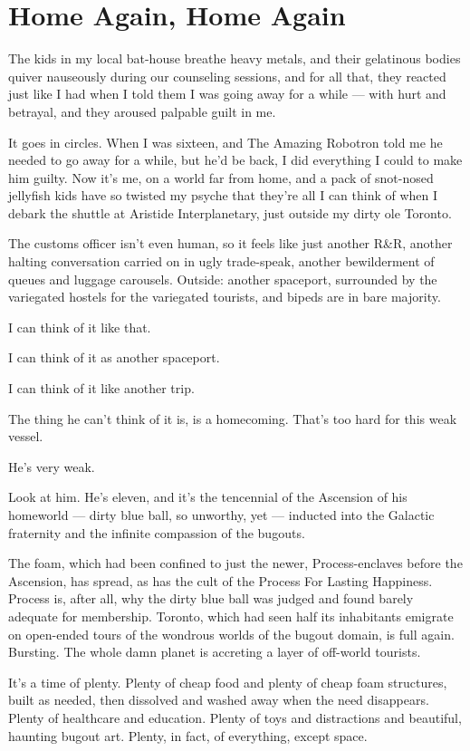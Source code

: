 \section{Home Again, Home Again}

The kids in my local bat-house breathe heavy metals, and their
gelatinous bodies quiver nauseously during our counseling sessions,
and for all that, they reacted just like I had when I told them I
was going away for a while --- with hurt and betrayal, and they
aroused palpable guilt in me.

It goes in circles. When I was sixteen, and The Amazing Robotron
told me he needed to go away for a while, but he'd be back, I did
everything I could to make him guilty. Now it's me, on a world far
from home, and a pack of snot-nosed jellyfish kids have so twisted
my psyche that they're all I can think of when I debark the shuttle
at Aristide Interplanetary, just outside my dirty ole Toronto.

The customs officer isn't even human, so it feels like just another
R\&R, another halting conversation carried on in ugly trade-speak,
another bewilderment of queues and luggage carousels. Outside:
another spaceport, surrounded by the variegated hostels for the
variegated tourists, and bipeds are in bare majority.

I can think of it like that.

I can think of it as another spaceport.

I can think of it like another trip.

The thing he can't think of it is, is a homecoming. That's too hard
for this weak vessel.

He's very weak.

\tb

Look at him. He's eleven, and it's the tencennial of the Ascension
of his homeworld --- dirty blue ball, so unworthy, yet --- inducted
into the Galactic fraternity and the infinite compassion of the
bugouts.

The foam, which had been confined to just the newer,
Process-enclaves before the Ascension, has spread, as has the cult
of the Process For Lasting Happiness. Process is, after all, why
the dirty blue ball was judged and found barely adequate for
membership. Toronto, which had seen half its inhabitants emigrate
on open-ended tours of the wondrous worlds of the bugout domain, is
full again. Bursting. The whole damn planet is accreting a layer of
off-world tourists.

It's a time of plenty. Plenty of cheap food and plenty of cheap
foam structures, built as needed, then dissolved and washed away
when the need disappears. Plenty of healthcare and education.
Plenty of toys and distractions and beautiful, haunting bugout art.
Plenty, in fact, of everything, except space.

